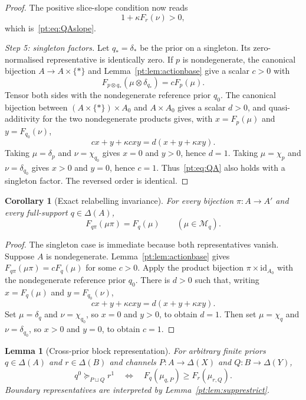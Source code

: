 \documentclass[11pt,a4paper]{article}
\newtheorem{lemma}[theorem]{Lemma}
\newtheorem{corollary}[theorem]{Corollary}
\theoremstyle{definition}
\newcommand{\1}{\mathbf 1}
\begin{document}
\begin{proof}
The positive slice-slope condition now reads
\[
1+\kappa F_r(\nu)>0,
\]
which is~\eqref{pt:eq:QAslope}.

\emph{Step 5: singleton factors.}
Let $q_*=\delta_*$ be the prior on a singleton.  Its zero-normalised representative is identically zero.  If $p$ is
nondegenerate, the canonical bijection $A\to A\times\{*\}$ and Lemma~\ref{pt:lem:actionbase} give a scalar $c>0$ with
\[
F_{p\otimes q_*}(\mu\otimes\delta_{q_*})=cF_p(\mu).
\]
Tensor both sides with the nondegenerate reference prior $q_0$.  The canonical bijection between
$(A\times\{*\})\times A_0$ and $A\times A_0$ gives a scalar $d>0$, and quasi-additivity for the two nondegenerate
products gives, with $x=F_p(\mu)$ and $y=F_{q_0}(\nu)$,
\[
cx+y+\kappa cxy=d(x+y+\kappa xy).
\]
Taking $\mu=\delta_p$ and $\nu=\chi_{q_0}$ gives $x=0$ and $y>0$, hence $d=1$.  Taking
$\mu=\chi_p$ and $\nu=\delta_{q_0}$ gives $x>0$ and $y=0$, hence $c=1$.  Thus~\eqref{pt:eq:QA} also holds with a singleton
factor.  The reversed order is identical.
\end{proof}

\begin{corollary}[Exact relabelling invariance]\label{pt:cor:permutationinvariance}
For every bijection $\pi:A\to A'$ and every full-support $q\in\Delta(A)$,
\[
F_{q\pi}(\mu\pi)=F_q(\mu)
\qquad(\mu\in\mathcal M_q).
\]
\end{corollary}

\begin{proof}
The singleton case is immediate because both representatives vanish.  Suppose $A$ is nondegenerate.  Lemma~\ref{pt:lem:actionbase}
gives $F_{q\pi}(\mu\pi)=cF_q(\mu)$ for some $c>0$.  Apply the product bijection
$\pi\times\mathrm{id}_{A_0}$ with the nondegenerate reference prior $q_0$.  There is $d>0$ such that, writing
$x=F_q(\mu)$ and $y=F_{q_0}(\nu)$,
\[
cx+y+\kappa cxy=d(x+y+\kappa xy).
\]
Set $\mu=\delta_q$ and $\nu=\chi_{q_0}$, so $x=0$ and $y>0$, to obtain $d=1$.  Then set
$\mu=\chi_q$ and $\nu=\delta_{q_0}$, so $x>0$ and $y=0$, to obtain $c=1$.
\end{proof}

\begin{lemma}[Cross-prior block representation]\label{pt:lem:blockbridge}
For arbitrary finite priors $q\in\Delta(A)$ and $r\in\Delta(B)$ and channels
$P:A\to\Delta(X)$ and $Q:B\to\Delta(Y)$,
\begin{equation}
q^0\succeq_{P\sqcup Q}r^1
\quad\Longleftrightarrow\quad
F_q(\mu_{q,P})\ge F_r(\mu_{r,Q}).
\tag{BC}\label{pt:eq:blockcomp}
\end{equation}
Boundary representatives are interpreted by Lemma~\ref{pt:lem:supprestrict}.
\end{lemma}
\end{document}
